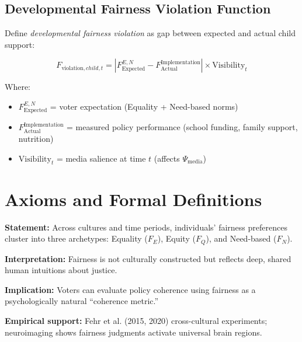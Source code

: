 \subsection{Developmental Fairness Violation Function}

Define \textit{developmental fairness violation} as gap between expected and actual child support:

\begin{equation}
F_{\text{violation},child,t} = |F_{\text{Expected}}^{E,N} - F_{\text{Actual}}^{\text{Implementation}}| \times \text{Visibility}_{t}
\end{equation}

Where:
\begin{itemize}[nosep]
\item $F_{\text{Expected}}^{E,N}$ = voter expectation (Equality + Need-based norms)
\item $F_{\text{Actual}}^{\text{Implementation}}$ = measured policy performance (school funding, family support, nutrition)
\item $\text{Visibility}_{t}$ = media salience at time $t$ (affects $\Psi_{\text{media}}$)
\end{itemize}

\section{Axioms and Formal Definitions}
\label{sec:cm-axioms}

\begin{tcolorbox}[colback=gray!5!white, colframe=gray!75!black,
    title=Axiom UNMAPPED_CM-1: Fairness Archetypes are Universal]

\textbf{Statement:} Across cultures and time periods, individuals' fairness preferences cluster
into three archetypes: Equality ($F_E$), Equity ($F_Q$), and Need-based ($F_N$).

\textbf{Interpretation:} Fairness is not culturally constructed but reflects deep, shared
human intuitions about justice.

\textbf{Implication:} Voters can evaluate policy coherence using fairness as a psychologically
natural ``coherence metric.''

\textbf{Empirical support:} Fehr et al. (2015, 2020) cross-cultural experiments; neuroimaging
shows fairness judgments activate universal brain regions.

\end{tcolorbox}

